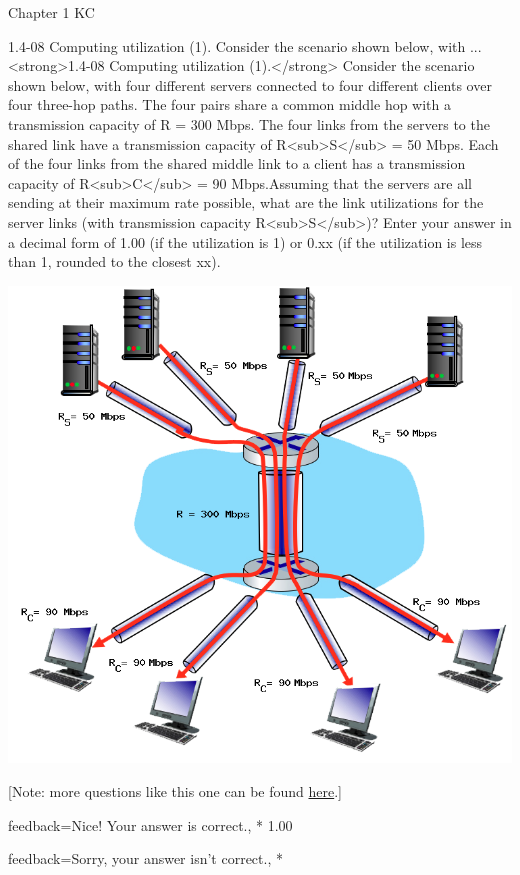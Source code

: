 \documentclass[a4paper]{article}
\begin{document}
\begin{quiz}{Chapter 1 KC}
\begin{shortanswer}[points=1]{1.4-08 Computing utilization (1). Consider the scenario shown below, with ...}
<strong>1.4-08 Computing utilization (1).</strong> Consider the scenario shown below, with four different servers connected to four different clients over four three-hop paths. The four pairs share a common middle hop with a transmission capacity of R = 300 Mbps. The four links from the servers to the shared link have a transmission capacity of R<sub>S</sub> = 50 Mbps. Each of the four links from the shared middle link to a client has a transmission capacity of R<sub>C</sub> = 90 Mbps.Assuming that the servers are all sending at their maximum rate possible, what are the link utilizations for the server links (with transmission capacity R<sub>S</sub>)? Enter your answer in a decimal form of 1.00 (if the utilization is 1) or 0.xx (if the utilization is less than 1, rounded to the closest xx). 
\begin{center}
\includegraphics[width=\linewidth]{figs/1.4.7.png}
\end{center}
 [Note: more questions like this one can be found \href{http://gaia.cs.umass.edu/kurose_ross/interactive/end-end-throughput-simple.php}{here}.]
\item[feedback={Nice!  Your answer is correct.},]* 1.00
\item[feedback={Sorry, your answer isn't correct.},] *
\end{shortanswer}


\end{quiz}
\end{document}
